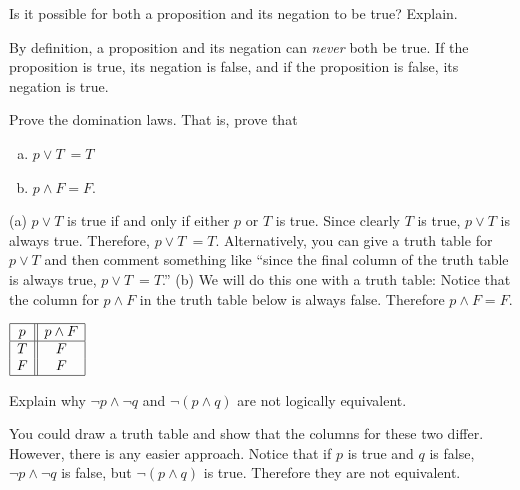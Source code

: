 \begin{requ}
Is it possible for both a proposition and its negation to be true? Explain.
\begin{requanswer}
By definition, a proposition and its negation can {\em never} both be true.
If the proposition is true, its negation is false, and if the proposition is false, its negation is true.
\end{requanswer}
\end{requ}


\begin{requ}
Prove the domination laws. That is, prove that
\begin{enumerate}[(a)]
\item
$ p\vee T \ = T$ 
\item
 $p\wedge F = F$.
\end{enumerate}
\begin{requanswer}
(a) $p\vee T$ is true if and only if either $p$ or $T$ is true. Since clearly $T$ is true, $p\vee T$ is always true.
Therefore, $ p\vee T \ = T$.
Alternatively, you can give a truth table for $p\vee T$ and then comment something like 
``since the final column of the truth table is always true, $ p\vee T \ = T$.''
(b) We will do this one with a truth table: 
Notice that the column for $p\wedge F$ in the truth table below is always false. Therefore  $p\wedge F = F$.

$\begin{array}{|c||c|} \hline p & p\wedge F \\
\hline
T & F\\
F & F\\
\hline
\end{array}$
\end{requanswer}
\end{requ}			
			
			

\begin{requ}
Explain why $\neg p \wedge \neg q$ and $\neg(p\wedge q)$ are not logically equivalent.
\begin{requanswer}
You could draw a truth table and show that the columns for these two differ. However, there is any easier approach.
Notice that if $p$ is true and $q$ is false, $\neg p \wedge \neg q$ is false, but $\neg(p\wedge q)$ is true.
Therefore they are not equivalent.
\end{requanswer}
\end{requ}


